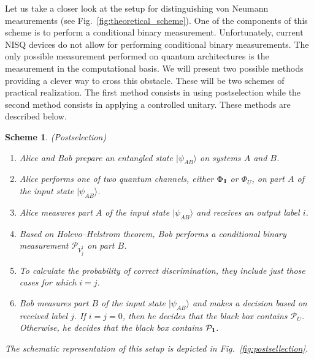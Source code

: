 \documentclass[preprint,12pt, a4paper]{elsarticle}
\newcommand{\ket}[1]{\ensuremath{|#1\rangle}}
\newcommand{\1}{{\rm 1\hspace{-0.9mm}l}}
\newcommand{\Id}{{\rm 1\hspace{-0.9mm}l}}
\newcommand{\PP}{\mathcal{P}}
\newtheorem{scheme}{Scheme}
\begin{document}
Let us take a closer look at the setup for distinguishing von Neumann 
measurements (see Fig.~\ref{fig:theoretical_scheme}). One of the components of 
this scheme is to perform a conditional binary measurement. 
Unfortunately, current NISQ devices do not allow for performing conditional 
binary measurements.
The only possible measurement performed on quantum architectures is the 
measurement in the computational basis. 
We  will present two possible methods providing a clever way to cross this 
obstacle. These will be two schemes of practical realization. 
The first method consists in using postselection while the second method 
consists in applying a controlled unitary. These methods are described below. 

\begin{scheme}(Postselection)








\begin{enumerate}
\item Alice and Bob prepare an entangled state $\ket{\psi_{AB}}$ on systems 
$A$ and $B$.
\item Alice performs one of two quantum channels, either $\Phi_{\Id}$ or 
$\Phi_{U}$,  on part $A$ of the input state  $\ket{\psi_{AB}}$.
\item Alice measures part $A$ of the input state  $\ket{\psi_{AB}}$ and 
receives an output label $i$.
\item  
Based on Holevo--Helstrom theorem, Bob performs a conditional binary 
measurement	$\PP_{V_j^\dagger}$ on part $B$.
\item To calculate the probability of correct discrimination, they include just those cases for which $i = j$.
\item Bob measures part $B$ of the input state  $\ket{\psi_{AB}}$ and makes a
decision based on received label $j$. If $i=j=0$, then he decides that the 
black box contains $\PP_U$. Otherwise, he decides that the black box contains
$\PP_{\Id}$.
\end{enumerate}


The schematic representation of this setup is depicted in 
Fig.~\ref{fig:postsellection}.     


\end{scheme}
\end{document}
